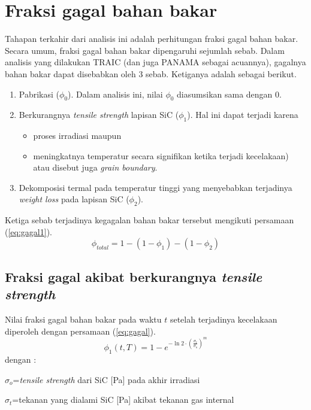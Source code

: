 \documentclass[a4paper,11pt]{report}
\begin{document}
\section{Fraksi gagal bahan bakar}
Tahapan terkahir dari analisis ini adalah perhitungan fraksi gagal bahan bakar. Secara umum, fraksi gagal bahan bakar dipengaruhi sejumlah sebab. Dalam analisis yang dilakukan TRAIC (dan juga PANAMA sebagai acuannya), gagalnya bahan bakar dapat disebabkan oleh 3 sebab. Ketiganya adalah sebagai berikut.
\begin{enumerate}
\item Pabrikasi ($\phi_0$). Dalam analisis ini, nilai $\phi_0$ diasumsikan sama dengan $0$.
\item Berkurangnya \textit{tensile strength} lapisan SiC ($\phi_1$). Hal ini dapat terjadi karena
\begin{itemize}
\item proses irradiasi maupun
\item meningkatnya temperatur secara signifikan ketika terjadi kecelakaan) atau disebut juga \textit{grain boundary}.
\end{itemize}  
\item Dekomposisi termal pada temperatur tinggi yang menyebabkan terjadinya \textit{weight loss} pada lapisan SiC ($\phi_2$).
\end{enumerate}

Ketiga sebab terjadinya kegagalan bahan bakar tersebut mengikuti persamaan (\ref{eq:gagal1}).
\begin{equation}
  \phi_{total}=1-(1-\phi_1) -(1-\phi_2)
  \label{eq:gagal1}
\end{equation}

\subsection{Fraksi gagal akibat berkurangnya \textit{tensile strength}}
Nilai fraksi gagal bahan bakar pada waktu $t$ setelah terjadinya kecelakaan diperoleh dengan persamaan (\ref{eq:gagal}).
\begin{equation}
  \phi_1(t,T)=1-e^{-\ln 2 \cdot \left(\frac{\sigma_t}{\sigma_o}\right)^m}
  \label{eq:gagal}
\end{equation}
dengan :
\begin{description}
  \item $\sigma_o$=\textit{tensile strength} dari SiC [Pa] pada akhir irradiasi
  \item $\sigma_t$=tekanan yang dialami SiC [Pa] akibat tekanan gas internal
\end{description}
\end{document}
